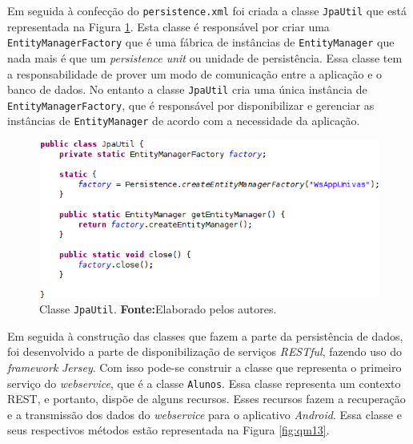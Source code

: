 	\par Em seguida à confecção do \texttt{persistence.xml} foi criada a classe
\texttt{JpaUtil} que está representada na Figura \ref{fig:qm12}.
Esta classe é responsável por criar uma \texttt{EntityManagerFactory} que é
uma  fábrica de instâncias de \texttt{EntityManager} que nada mais é que um
\textit{persistence unit} ou unidade de persistência. Essa classe tem a
responsabilidade de prover um modo de comunicação entre a aplicação e o banco
de dados. No entanto a classe \texttt{JpaUtil} cria uma única instância de
\texttt{EntityManagerFactory}, que é responsável por disponibilizar e
gerenciar as instâncias de \texttt{EntityManager} de acordo com a necessidade
da aplicação.
		
		\pagebreak
		\begin{figure}[h!]
			\centerline{\includegraphics[scale=0.7]{./imagens/2_q_metodologico/qm12.png}}
			\caption[Classe \texttt{JpaUtil}]{Classe \texttt{JpaUtil}.
			\textbf{Fonte:}Elaborado pelos autores.}
			\label{fig:qm12}
		\end{figure}
		
	\par Em seguida à construção das classes que fazem a parte da persistência de
dados, foi desenvolvido a parte de disponibilização de serviços
\textit{RESTful}, fazendo uso do \textit{framework} \textit{Jersey}. Com isso
pode-se construir a classe que representa o primeiro serviço do
\textit{webservice}, que é a classe \texttt{Alunos}. Essa classe representa um
contexto REST, e portanto, dispõe de alguns recursos. Esses recursos fazem a
recuperação e a transmissão dos dados do \textit{webservice} para o aplicativo
\textit{Android}. Essa classe e seus respectivos métodos  estão representada na
Figura \ref{fig:qm13}.

